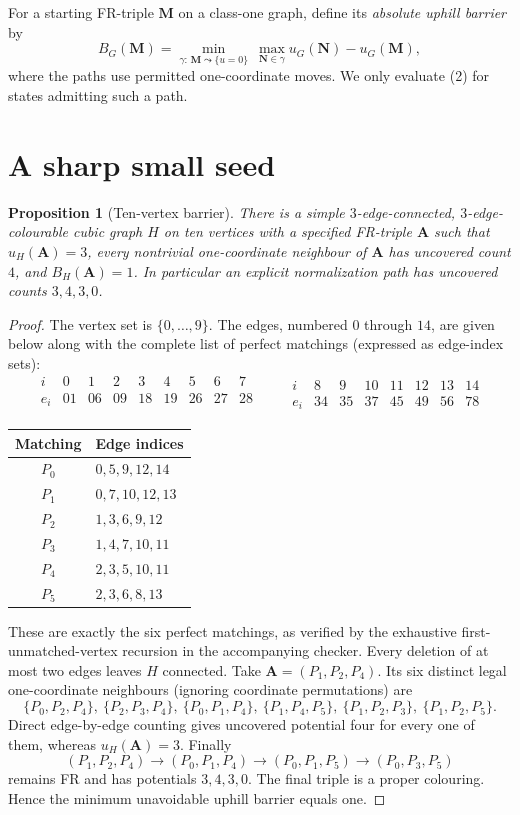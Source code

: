 \documentclass[11pt]{article}
\newtheorem{proposition}{Proposition}
\begin{document}
For a starting FR-triple $\mathbf M$ on a class-one graph, define its \emph{absolute uphill barrier} by
\[
 B_G(\mathbf M)=\min_{\gamma:\,\mathbf M\leadsto\{u=0\}}\ \max_{\mathbf N\in\gamma}u_G(\mathbf N)-u_G(\mathbf M), \tag{2}
\]
where the paths use permitted one-coordinate moves. We only evaluate (2) for states admitting such a path.

\section{A sharp small seed}
\begin{proposition}[Ten-vertex barrier]\label{prop:seed}
There is a simple $3$-edge-connected, $3$-edge-colourable cubic graph $H$ on ten vertices with a specified FR-triple $\mathbf A$ such that $u_H(\mathbf A)=3$, every nontrivial one-coordinate neighbour of $\mathbf A$ has uncovered count $4$, and $B_H(\mathbf A)=1$. In particular an explicit normalization path has uncovered counts $3,4,3,0$.
\end{proposition}
\begin{proof}
The vertex set is $\{0,\ldots,9\}$. The edges, numbered $0$ through $14$, are given below along with the complete list of perfect matchings (expressed as edge-index sets):
\[
\begin{array}{r|rrrrrrrr}
 i&0&1&2&3&4&5&6&7\\\hline
 e_i&01&06&09&18&19&26&27&28\\[2pt]
\end{array}\qquad
\begin{array}{r|rrrrrrr}
 i&8&9&10&11&12&13&14\\\hline
 e_i&34&35&37&45&49&56&78
\end{array}
\]
\begin{center}
\begin{tabular}{c@{\quad}l}
\toprule
Matching & Edge indices\\\midrule
$P_0$ & $0,5,9,12,14$\\
$P_1$ & $0,7,10,12,13$\\
$P_2$ & $1,3,6,9,12$\\
$P_3$ & $1,4,7,10,11$\\
$P_4$ & $2,3,5,10,11$\\
$P_5$ & $2,3,6,8,13$\\\bottomrule
\end{tabular}
\end{center}
These are exactly the six perfect matchings, as verified by the exhaustive first-unmatched-vertex recursion in the accompanying checker. Every deletion of at most two edges leaves $H$ connected. Take $\mathbf A=(P_1,P_2,P_4)$. Its six distinct legal one-coordinate neighbours (ignoring coordinate permutations) are
\[
 \{P_0,P_2,P_4\},\ \{P_2,P_3,P_4\},\ \{P_0,P_1,P_4\},\ \{P_1,P_4,P_5\},\ \{P_1,P_2,P_3\},\ \{P_1,P_2,P_5\}.
\]
Direct edge-by-edge counting gives uncovered potential four for every one of them, whereas $u_H(\mathbf A)=3$. Finally
\[
 (P_1,P_2,P_4)\longrightarrow(P_0,P_1,P_4)
 \longrightarrow(P_0,P_1,P_5)\longrightarrow(P_0,P_3,P_5)
\]
remains FR and has potentials $3,4,3,0$. The final triple is a proper colouring. Hence the minimum unavoidable uphill barrier equals one.
\end{proof}
\end{document}
